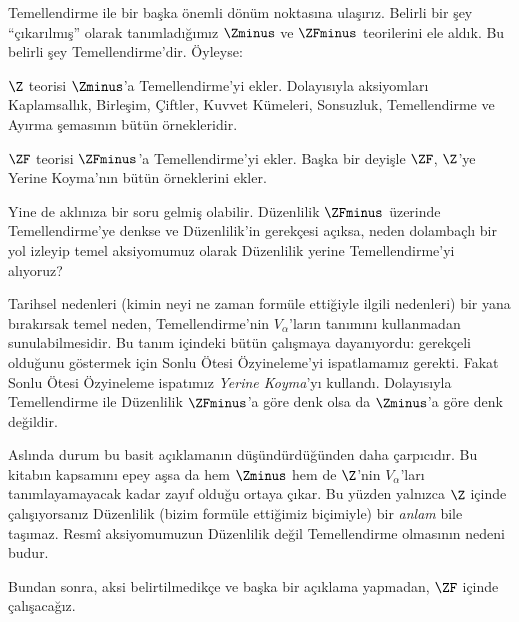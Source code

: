 \documentclass[../../../include/open-logic-section]{subfiles}
\begin{document}

Temellendirme ile bir başka önemli dönüm noktasına ulaşırız. Belirli bir şey
``çıkarılmış'' olarak tanımladığımız $\Zminus$ ve $\ZFminus$ teorilerini
ele aldık. Bu belirli şey Temellendirme'dir. Öyleyse:

\begin{defn}
$\Z$ teorisi $\Zminus$'a Temellendirme'yi ekler. Dolayısıyla aksiyomları
Kaplamsallık, Birleşim, Çiftler, Kuvvet Kümeleri, Sonsuzluk, Temellendirme ve
Ayırma şemasının bütün örnekleridir.

$\ZF$ teorisi $\ZFminus$'a Temellendirme'yi ekler. Başka bir deyişle
$\ZF$, $\Z$'ye Yerine Koyma'nın bütün örneklerini ekler.
\end{defn}

Yine de aklınıza bir soru gelmiş olabilir. Düzenlilik $\ZFminus$ üzerinde
Temellendirme'ye denkse ve Düzenlilik'in gerekçesi açıksa, neden dolambaçlı
bir yol izleyip temel aksiyomumuz olarak Düzenlilik yerine Temellendirme'yi
alıyoruz?

Tarihsel nedenleri (kimin neyi ne zaman formüle ettiğiyle ilgili nedenleri)
bir yana bırakırsak temel neden, Temellendirme'nin $V_\alpha$'ların tanımını
kullanmadan sunulabilmesidir. Bu tanım  içindeki
bütün çalışmaya dayanıyordu: gerekçeli olduğunu göstermek için Sonlu Ötesi
Özyineleme'yi ispatlamamız gerekti. Fakat Sonlu Ötesi Özyineleme ispatımız
\emph{Yerine Koyma}'yı kullandı. Dolayısıyla Temellendirme ile Düzenlilik
$\ZFminus$'a göre denk olsa da $\Zminus$'a göre denk değildir.

Aslında durum bu basit açıklamanın düşündürdüğünden daha çarpıcıdır. Bu
kitabın kapsamını epey aşsa da hem $\Zminus$ hem de $\Z$'nin
$V_\alpha$'ları tanımlayamayacak kadar zayıf olduğu ortaya çıkar. Bu yüzden
yalnızca $\Z$ içinde çalışıyorsanız Düzenlilik (bizim formüle ettiğimiz
biçimiyle) bir \emph{anlam} bile taşımaz. Resmî aksiyomumuzun Düzenlilik
değil Temellendirme olmasının nedeni budur.

Bundan sonra, aksi belirtilmedikçe ve başka bir açıklama yapmadan, $\ZF$
içinde çalışacağız.
\end{document}

